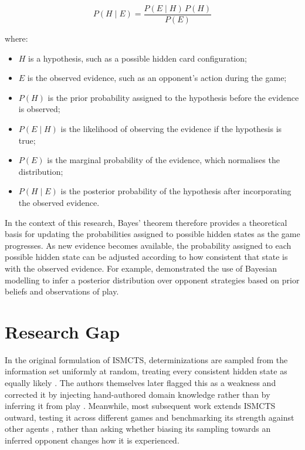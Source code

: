 \documentclass[12pt,a4paper,oneside]{report}
\begin{document}
\begin{equation}
  P(H \mid E) = \frac{P(E \mid H)\,P(H)}{P(E)}
  \label{eq:bayes}
\end{equation}

where:
\begin{itemize}
  \item \(H\) is a hypothesis, such as a possible hidden card configuration;
  \item \(E\) is the observed evidence, such as an opponent's action during the game;
  \item \(P(H)\) is the prior probability assigned to the hypothesis before the evidence is observed;
  \item \(P(E \mid H)\) is the likelihood of observing the evidence if the hypothesis is true;
  \item \(P(E)\) is the marginal probability of the evidence, which normalises the distribution;
  \item \(P(H \mid E)\) is the posterior probability of the hypothesis after incorporating the observed evidence.
\end{itemize}

In the context of this research, Bayes' theorem therefore provides a theoretical basis for updating the probabilities assigned to possible hidden states as the game progresses. As new evidence becomes available, the probability assigned to each possible hidden state can be adjusted according to how consistent that state is with the observed evidence. For example, \textcite{southey2005bayes} demonstrated the use of Bayesian modelling to infer a posterior distribution over opponent strategies based on prior beliefs and observations of play.


\section{Research Gap}
\label{sec:research-gap}

In the original formulation of ISMCTS,
determinizations are sampled from the information set uniformly at random, treating every
consistent hidden state as equally likely \parencite{cowling2012ismcts}. The authors themselves later flagged this as a weakness and corrected it by injecting hand-authored domain
knowledge rather than by inferring it from play \parencite{whitehouse2011determinization}.
Meanwhile, most subsequent work extends ISMCTS outward, testing it across different games
and benchmarking its strength against other agents \parencite{cowling2012magic,
goodman2019hanabi}, rather than asking whether biasing its sampling towards an inferred
opponent changes how it is experienced.
\end{document}
